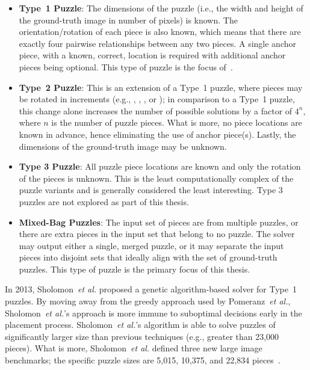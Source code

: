 \begin{itemize}

	\item \textbf{Type~1 Puzzle}: The dimensions of the puzzle (i.e., the width and height of the ground-truth image in number of pixels) is known.  The orientation/rotation of each piece is also known, which means that there are exactly four pairwise relationships between any two pieces.  A single anchor piece, with a known, correct, location is required with additional anchor pieces being optional.  This type of puzzle is the focus of~\cite{cho2010, pomeranz2011}.
	
	\item \textbf{Type~2 Puzzle}: This is an extension of a Type~1 puzzle, where pieces may be rotated in  increments (e.g., , , , or ); in comparison to a Type~1 puzzle, this change alone increases the number of possible solutions by a factor of $4^n$, where $n$ is the number of puzzle pieces.  What is more, no piece locations are known in advance, hence eliminating the use of anchor piece(s).  Lastly, the dimensions of the ground-truth image may be unknown.
	
	\item \textbf{Type 3 Puzzle}: All puzzle piece locations are known and only the rotation of the pieces is unknown.  This is the least computationally complex of the puzzle variants and is generally considered the least interesting.  Type 3 puzzles are not explored as part of this thesis.
	
	\item \textbf{Mixed-Bag Puzzles}: The input set of pieces are from multiple puzzles, or there are extra pieces in the input set that belong to no puzzle.  The solver may output either a single, merged puzzle, or it may separate the input pieces into disjoint sets that ideally align with the set of ground-truth puzzles.  This type of puzzle is the primary focus of this thesis.

\end{itemize}

In 2013, Sholomon~\textit{et al.}\cite{sholomon2013} proposed a genetic algorithm-based solver for Type~1 puzzles.  By moving away from the greedy approach used by Pomeranz~\textit{et al.}, Sholomon~\textit{et al.}'s approach is more immune to suboptimal decisions early in the placement process. Sholomon~\textit{et al.}'s algorithm is able to solve puzzles of significantly larger size than previous techniques (e.g., greater than 23,000 pieces).  What is more, Sholomon~\textit{et al.} defined three new large image benchmarks; the specific puzzle sizes are 5,015, 10,375, and 22,834 pieces~\cite{sholomonBenchmarkImages}.

